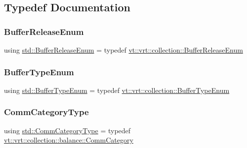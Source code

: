 \subsection{Typedef Documentation}
\mbox{\label{namespacestd_a881b600944be212a7a1b9ac199fb2f88}} 
\subsubsection{\texorpdfstring{Buffer\+Release\+Enum}{BufferReleaseEnum}}
{\footnotesize\ttfamily using \hyperlink{namespacevt_1_1vrt_1_1collection_a2545006e681bacc1f00be9d5d6bdc8fa}{std\+::\+Buffer\+Release\+Enum} = typedef \hyperlink{namespacevt_1_1vrt_1_1collection_a2545006e681bacc1f00be9d5d6bdc8fa}{vt\+::vrt\+::collection\+::\+Buffer\+Release\+Enum}}

\mbox{\label{namespacestd_ab5492c80007bc5a00cc49a954c809d6f}} 
\subsubsection{\texorpdfstring{Buffer\+Type\+Enum}{BufferTypeEnum}}
{\footnotesize\ttfamily using \hyperlink{namespacevt_1_1vrt_1_1collection_a1b1b082e2ff4e9e5d1b7227acd78db3f}{std\+::\+Buffer\+Type\+Enum} = typedef \hyperlink{namespacevt_1_1vrt_1_1collection_a1b1b082e2ff4e9e5d1b7227acd78db3f}{vt\+::vrt\+::collection\+::\+Buffer\+Type\+Enum}}

\mbox{\label{namespacestd_a4dd27d43e4725feae37124932561af56}} 
\subsubsection{\texorpdfstring{Comm\+Category\+Type}{CommCategoryType}}
{\footnotesize\ttfamily using \hyperlink{namespacevt_1_1vrt_1_1collection_1_1balance_a9cc6c6884ca0416dae824e9204093c57}{std\+::\+Comm\+Category\+Type} = typedef \hyperlink{namespacevt_1_1vrt_1_1collection_1_1balance_a9cc6c6884ca0416dae824e9204093c57}{vt\+::vrt\+::collection\+::balance\+::\+Comm\+Category}}

